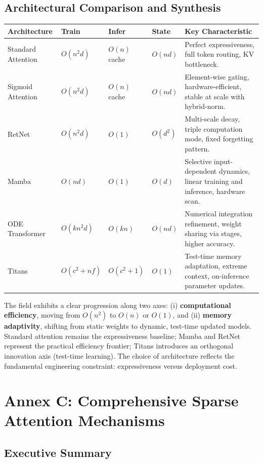 \documentclass[11pt,a4paper]{article}
\begin{document}
\subsection{Architectural Comparison and Synthesis}

\small
\begin{longtable}{p{2.0cm}p{1.8cm}p{1.6cm}p{1.6cm}p{4.5cm}}
\toprule
\textbf{Architecture} & \textbf{Train} & \textbf{Infer} & \textbf{State} & \textbf{Key Characteristic} \\
\midrule
\endhead
Standard Attention & $O(n^2 d)$ & $O(n)$ cache & $O(nd)$ & Perfect expressiveness, full token routing, KV bottleneck. \\
Sigmoid Attention & $O(n^2 d)$ & $O(n)$ cache & $O(nd)$ & Element-wise gating, hardware-efficient, stable at scale with hybrid-norm. \\
RetNet & $O(n^2 d)$ & $O(1)$ & $O(d^2)$ & Multi-scale decay, triple computation mode, fixed forgetting pattern. \\
Mamba & $O(nd)$ & $O(1)$ & $O(d)$ & Selective input-dependent dynamics, linear training and inference, hardware scan. \\
ODE Transformer & $O(kn^2 d)$ & $O(kn)$ & $O(nd)$ & Numerical integration refinement, weight sharing via stages, higher accuracy. \\
Titans & $O(c^2 + nf)$ & $O(c^2 + 1)$ & $O(1)$ & Test-time memory adaptation, extreme context, on-inference parameter updates. \\
\bottomrule
\end{longtable}
\normalsize

The field exhibits a clear progression along two axes: (i) \textbf{computational efficiency}, moving from $O(n^2)$ to $O(n)$ or $O(1)$, and (ii) \textbf{memory adaptivity}, shifting from static weights to dynamic, test-time updated models. Standard attention remains the expressiveness baseline; Mamba and RetNet represent the practical efficiency frontier; Titans introduces an orthogonal innovation axis (test-time learning). The choice of architecture reflects the fundamental engineering constraint: expressiveness versus deployment cost.

\section{Annex C: Comprehensive Sparse Attention Mechanisms}
\label{sec:annex-sparse}

\subsection{Executive Summary}
\end{document}
